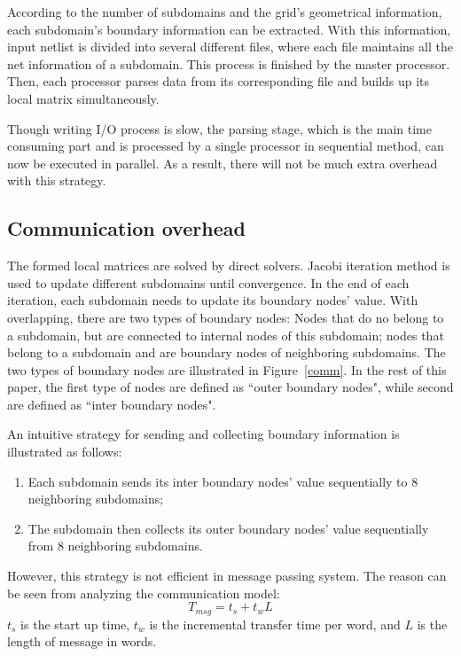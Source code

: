 \documentclass{sig-alternate}
\begin{document}
	According to the number of subdomains and the grid's geometrical information, each subdomain's boundary information can be 
	extracted. With this information, input netlist is divided into several different files, where each file maintains all the net 
	information of a subdomain. This process is finished by the master processor. Then, each processor parses data from its
	corresponding file and builds up its local matrix simultaneously.

	Though writing I/O process is slow, the parsing stage, which is the main time consuming part and is 
	processed by a single processor in sequential method, can now be executed in parallel. As a result, 
	there will not be much extra overhead with this strategy.
     \subsection{Communication overhead}
	The formed local matrices are solved by direct solvers. Jacobi iteration method is used
	to update different subdomains until convergence. In the end of each iteration, each subdomain needs to update its 
	boundary nodes' value. With overlapping, there are two types of boundary nodes: Nodes that do no 
	belong to a subdomain, but are connected to internal nodes of 
	this subdomain; nodes that belong to a subdomain and are boundary nodes of neighboring subdomains. The 
	two types of boundary nodes are illustrated in Figure~\ref{comm}. In the rest of this paper, the first type of nodes are defined
	as ``outer boundary nodes", while second are defined as ``inter boundary nodes". 

	An intuitive strategy for sending and collecting boundary information is illustrated as follows:

	\begin{enumerate}[1.]
	  \item Each subdomain sends its inter boundary nodes' value sequentially to 8 neighboring subdomains;
	  \item The subdomain then collects its outer boundary nodes' value sequentially from 8 neighboring subdomains.
	\end{enumerate}	

 	However, this strategy is not efficient in message passing system. The reason can be seen from analyzing the
	communication model:
	\begin{equation}
		T_{msg} = t_s + t_wL\label{eq_msg}
	\end{equation}
	$t_s$ is the start up time, $t_w$ is the incremental transfer time per word, and $L$ is the length of message in words.
	
\end{document}
